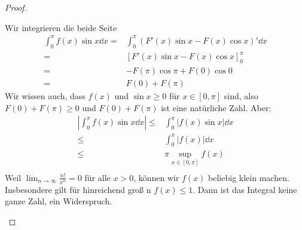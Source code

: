 \begin{proof}
\begin{parts}
	Wir integrieren die beide Seite
	\begin{align*}
		\int_0^\pi f(x)\sin x\dd{x}=&\int_0^\pi (F'(x)\sin x-F(x)\cos x)'\dd{x}\\
		=& \left[ F'(x)\sin x-F(x)\cos x \right]_0^\pi\\
		=& -F(\pi)\cos\pi + F(0)\cos 0\\
		=& F(0)+F(\pi)
	\end{align*}
	Wir wissen auch, dass $f(x)$ und $\sin x \ge 0$ f\"{u}r $x\in [0,\pi]$ sind, also $F(0)+F(\pi)\ge 0$ und $F(0)+F(\pi)$ ist eine natürliche Zahl. Aber:
	\begin{align*}
		\left| \int_0^\pi f(x)\sin x\dd{x} \right| \le& \int_0^\pi |f(x)\sin x|\dd{x}\\
		\le& \int_0^\pi |f(x)|\dd{x}\\
		\le& \pi\sup_{x\in [0,\pi]} f(x)\\
	\end{align*}
	Weil $\lim_{n \to \infty} \frac{n!}{x^n}=0$ f\"{u}r alle $x>0$, können wir $f(x)$ beliebig klein machen. Insbesondere gilt f\"{u}r hinreichend groß n $f(x)\le 1$. Dann ist das Integral keine ganze Zahl, ein Widerspruch.\qedhere
	\end{parts}
\end{proof}
